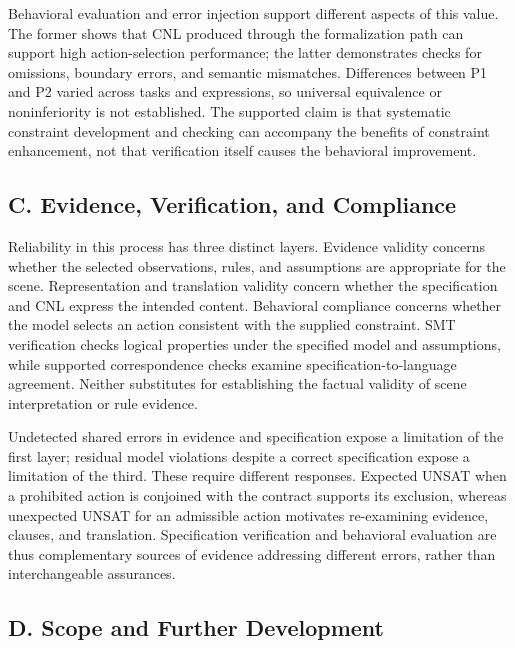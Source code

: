 \documentclass[11pt,a4paper]{article}
\begin{document}
Behavioral evaluation and error injection support different aspects of this value. The former shows that CNL produced through the formalization path can support high action-selection performance; the latter demonstrates checks for omissions, boundary errors, and semantic mismatches. Differences between P1 and P2 varied across tasks and expressions, so universal equivalence or noninferiority is not established. The supported claim is that systematic constraint development and checking can accompany the benefits of constraint enhancement, not that verification itself causes the behavioral improvement.\par

\newpage
\subsection*{C. Evidence, Verification, and Compliance}

Reliability in this process has three distinct layers. Evidence validity concerns whether the selected observations, rules, and assumptions are appropriate for the scene. Representation and translation validity concern whether the specification and CNL express the intended content. Behavioral compliance concerns whether the model selects an action consistent with the supplied constraint. SMT verification checks logical properties under the specified model and assumptions, while supported correspondence checks examine specification-to-language agreement. Neither substitutes for establishing the factual validity of scene interpretation or rule evidence.\par

Undetected shared errors in evidence and specification expose a limitation of the first layer; residual model violations despite a correct specification expose a limitation of the third. These require different responses. Expected UNSAT when a prohibited action is conjoined with the contract supports its exclusion, whereas unexpected UNSAT for an admissible action motivates re-examining evidence, clauses, and translation. Specification verification and behavioral evaluation are thus complementary sources of evidence addressing different errors, rather than interchangeable assurances.\par

\subsection*{D. Scope and Further Development}
\end{document}
